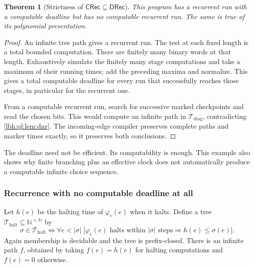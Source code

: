 \documentclass[11pt,letterpaper]{article}
\newtheorem{theorem}{Theorem}[section]
\theoremstyle{definition}
\theoremstyle{remark}
\newcommand{\N}{\mathbb N}
\newcommand{\CRec}{\mathsf{CRec}}
\newcommand{\DRec}{\mathsf{DRec}}
\newcommand{\1}{\mathbf 1}
\newcommand{\T}{\mathcal T}
\begin{document}
\begin{theorem}[Strictness of $\CRec\subseteq\DRec$]
\label{lbh:ql:thm:firstseparation}
This program has a recurrent run with a computable deadline but has no
computable recurrent run. The same is true of its polynomial presentation.
\end{theorem}
\begin{proof}
An infinite tree path gives a recurrent run. The test at each fixed length is
a total bounded computation. There are finitely many binary words at that
length. Exhaustively simulate the finitely many stage computations and take
a maximum of their running times; add the preceding maxima and normalize.
This gives a total computable deadline for every run that successfully reaches
those stages, in particular for the recurrent one.

From a computable recurrent run, search for successive marked checkpoints
and read the chosen bits. This would compute an infinite path in
$\T_{\mathrm{diag}}$, contradicting \cref{lbh:ql:lem:dnr}. The incoming-edge
compiler preserves complete paths and marker times exactly, so it preserves
both conclusions.
\end{proof}
The deadline need not be efficient. Its computability is enough. This example
also shows why finite branching plus an effective clock does not automatically
produce a computable infinite choice sequence.

\subsubsection{Recurrence with no computable deadline at all}
Let $h(e)$ be the halting time of $\varphi_e(e)$ when it halts. Define a tree
$\T_{\mathrm{halt}}\subseteq\N^{<\N}$ by
\begin{equation}\label{lbh:ql:eq:halttree}
 \sigma\in\T_{\mathrm{halt}}
 \iff
 \forall e<|\sigma|\;
 \bigl[\varphi_e(e)\text{ halts within }|\sigma|\text{ steps}
       \Longrightarrow h(e)\leq\sigma(e)\bigr].
\end{equation}
Again membership is decidable and the tree is prefix-closed. There is an
infinite path $f$, obtained by taking $f(e)=h(e)$ for halting computations and
$f(e)=0$ otherwise.
\end{document}
